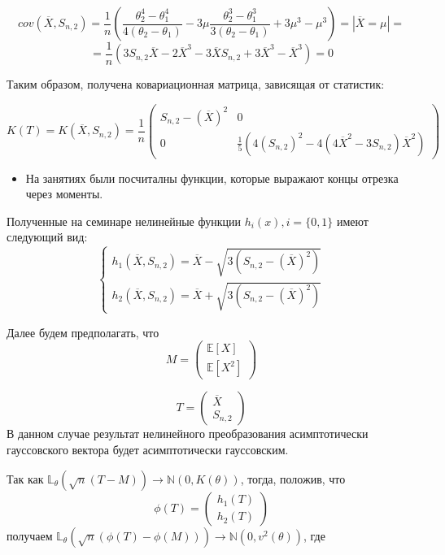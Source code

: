 \documentclass{article}
\begin{document}
\[cov\left(\overline{X}, S_{n, 2}\right)=\frac{1}{n}\left(\frac{\theta_2^{4} - \theta_1^{4}}{4(\theta_2-\theta_1)}-3\mu\frac{\theta_2^{3} - \theta_1^{3}}{3(\theta_2-\theta_1)}+3\mu^3-\mu^3\right) = \left|\overline{X} = \mu\right| = \]
\[ = \frac{1}{n}\left(3S_{n, 2}\overline{X} - 2\overline{X}^3-3\overline{X}S_{n,2}+3\overline{X}^3-\overline{X}^3\right) = 0\]

Таким образом, получена ковариационная матрица, зависящая от статистик:

\[K(T) = K\left(\overline{X}, S_{n, 2}\right) = \frac{1}{n}
\begin{pmatrix}
	S_{n, 2} - \left(\overline{X}\right)^2 & 0\\
	0 & \frac{1}{5}\left(4(S_{n, 2})^2 - 4(4\overline{X}^2-3S_{n, 2})\overline{X}^2\right)
\end{pmatrix}\]
\begin{itemize}
	\item На занятиях были посчиталны функции, которые выражают концы отрезка через моменты.
\end{itemize}

Полученные на семинаре нелинейные функции $h_i(x), i = \{0, 1\}$ имеют следующий вид:
\begin{equation*}
	\begin{cases}
		h_1\left(\overline{X}, S_{n, 2}\right) = \overline{X}-\sqrt{3\left(S_{n, 2}-(\overline{X})^2\right)}\\
		h_2\left(\overline{X}, S_{n, 2}\right) = \overline{X}+\sqrt{3\left(S_{n, 2}-(\overline{X})^2\right)}
	\end{cases}
\end{equation*}

Далее будем предполагать, что 
\[M = 
\begin{pmatrix}
	\mathbb{E}[X] \\
	\mathbb{E}\left[X^2\right] 
\end{pmatrix}\]

\[T = 
\begin{pmatrix}
	\overline{X}\\
	S_{n, 2}
\end{pmatrix}\]
В данном случае результат нелинейного преобразования асимптотически гауссовского вектора будет асимптотически гауссовским.

Так как $\mathbb{L}_\theta\left(\sqrt{n}\left(T-M\right)\right) \to \mathbb{N}\left(0, K(\theta)\right)$, тогда, положив, что
\[\phi(T) = 
\begin{pmatrix}
	h_1(T) \\
	h_2(T)
\end{pmatrix}\] получаем $\mathbb{L}_\theta\left(\sqrt{n}\left(\phi(T)-\phi(M)\right)\right) \to \mathbb{N}\left(0, v^2(\theta)\right)$, где 
\end{document}
